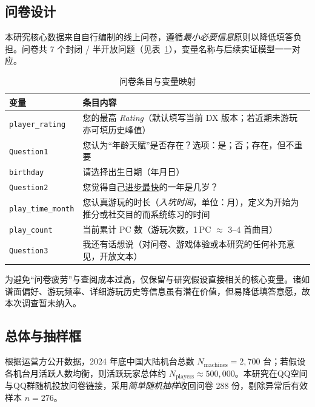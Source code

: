 \documentclass[12pt]{article}
\begin{document}
\subsection{问卷设计}

本研究核心数据来自自行编制的线上问卷，遵循\emph{最小必要信息}原则以降低填答负担。问卷共 7 个封闭 / 半开放问题（见表~\ref{tab:items}），变量名称与后续实证模型一一对应。

\begin{table}[htbp]
	\centering
	\caption{问卷条目与变量映射}\label{tab:items}
	\begin{tabularx}{\textwidth}{@{} l X @{}}
		\toprule
		\textbf{变量} & \textbf{条目内容} \\
		\midrule
		\texttt{player\_rating} &
		您的最高 \textit{Rating}（默认填写当前 DX 版本；若近期未游玩亦可填历史峰值） \\[2pt]
		\texttt{Question1} &
		您认为“年龄天赋”是否存在？选项：是；否；存在，但不重要 \\[2pt]
		\texttt{birthday} &
		请选择出生日期（年月日） \\[2pt]
		\texttt{Question2} &
		您觉得自己\uline{进步最快}的一年是几岁？ \\[2pt]
		\texttt{play\_time\_month} &
		您认真游玩的时长（\emph{入坑时间}，单位：月），定义为开始为推分或社交目的而系统练习的时间 \\[2pt]
		\texttt{play\_count} &
		当前累计 PC 数（游玩次数，1\,PC $\approx$ 3–4 首曲目） \\[2pt]
		\texttt{Question3} &
		我还有话想说（对问卷、游戏体验或本研究的任何补充意见，开放文本） \\
		\bottomrule
	\end{tabularx}
\end{table}

为避免“问卷疲劳”与查阅成本过高，仅保留与研究假设直接相关的核心变量。诸如谱面偏好、游玩频率、详细游玩历史等信息虽有潜在价值，但易降低填答意愿，故本次调查暂未纳入。



\subsection{总体与抽样框}

根据运营方公开数据，2024 年底中国大陆机台总数 $N_{\text{machines}}=2{,}700$ 台；若假设各机台月活跃人数均衡，则活跃玩家总体约 $N_{\text{players}}\approx500{,}000$。本研究在QQ空间与QQ群随机投放问卷链接，采用\emph{简单随机抽样}收回问卷 288 份，剔除异常后有效样本 $n=276$。
\end{document}
